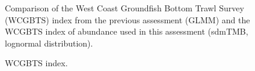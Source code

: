 \documentclass[
]{scrartcl}
\begin{document}
\begin{figure}[H]


\caption{\label{fig-WCGBTS_comparison}Comparison of the West Coast
Groundfish Bottom Trawl Survey (WCGBTS) index from the previous
assessment (GLMM) and the WCGBTS index of abundance used in this
assessment (sdmTMB, lognormal distribution).}

\end{figure}%

\begin{figure}[H]


\caption{\label{fig-WCGBTS_index}WCGBTS index.}

\end{figure}%
\end{document}
